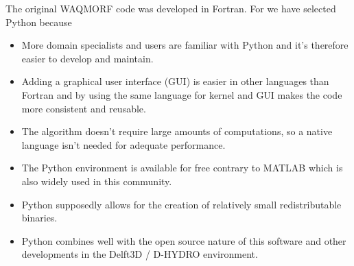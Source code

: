 The original WAQMORF code was developed in Fortran.
For \dfastmi we have selected Python because

\begin{itemize}
\item More domain specialists and users are familiar with Python and it's therefore easier to develop and maintain.
\item Adding a graphical user interface (GUI) is easier in other languages than Fortran and by using the same language for kernel and GUI makes the code more consistent and reusable.
\item The algorithm doesn't require large amounts of computations, so a native language isn't needed for adequate performance.
\item The Python environment is available for free contrary to MATLAB which is also widely used in this community.
\item Python supposedly allows for the creation of relatively small redistributable binaries.
\item Python combines well with the open source nature of this software and other developments in the Delft3D / D-HYDRO environment.
\end{itemize}
